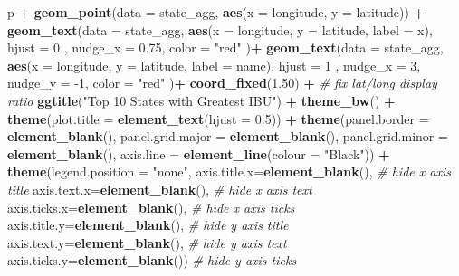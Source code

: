 \documentclass[
]{article}
\newenvironment{Shaded}{\begin{snugshade}}{\end{snugshade}}
\newcommand{\CommentTok}[1]{\textcolor[rgb]{0.56,0.35,0.01}{\textit{#1}}}
\newcommand{\DataTypeTok}[1]{\textcolor[rgb]{0.13,0.29,0.53}{#1}}
\newcommand{\DecValTok}[1]{\textcolor[rgb]{0.00,0.00,0.81}{#1}}
\newcommand{\FloatTok}[1]{\textcolor[rgb]{0.00,0.00,0.81}{#1}}
\newcommand{\KeywordTok}[1]{\textcolor[rgb]{0.13,0.29,0.53}{\textbf{#1}}}
\newcommand{\NormalTok}[1]{#1}
\newcommand{\OperatorTok}[1]{\textcolor[rgb]{0.81,0.36,0.00}{\textbf{#1}}}
\newcommand{\StringTok}[1]{\textcolor[rgb]{0.31,0.60,0.02}{#1}}
\begin{document}
\begin{Shaded}
\begin{Highlighting}[]
\NormalTok{p }\OperatorTok{+}\StringTok{ }\KeywordTok{geom_point}\NormalTok{(}\DataTypeTok{data =}\NormalTok{ state_agg, }\KeywordTok{aes}\NormalTok{(}\DataTypeTok{x =}\NormalTok{ longitude, }\DataTypeTok{y =}\NormalTok{ latitude)) }\OperatorTok{+}\StringTok{ }\KeywordTok{geom_text}\NormalTok{(}\DataTypeTok{data =}\NormalTok{ state_agg, }\KeywordTok{aes}\NormalTok{(}\DataTypeTok{x =}\NormalTok{ longitude, }\DataTypeTok{y =}\NormalTok{ latitude, }\DataTypeTok{label =}\NormalTok{ x), }\DataTypeTok{hjust =} \DecValTok{0}\NormalTok{ , }\DataTypeTok{nudge_x =} \FloatTok{0.75}\NormalTok{, }\DataTypeTok{color =} \StringTok{"red"}\NormalTok{ )}\OperatorTok{+}
\StringTok{   }\KeywordTok{geom_text}\NormalTok{(}\DataTypeTok{data =}\NormalTok{ state_agg, }\KeywordTok{aes}\NormalTok{(}\DataTypeTok{x =}\NormalTok{ longitude, }\DataTypeTok{y =}\NormalTok{ latitude, }\DataTypeTok{label =}\NormalTok{ name), }\DataTypeTok{hjust =} \DecValTok{1}\NormalTok{ , }\DataTypeTok{nudge_x =} \DecValTok{3}\NormalTok{, }\DataTypeTok{nudge_y =} \DecValTok{-1}\NormalTok{, }\DataTypeTok{color =} \StringTok{"red"}\NormalTok{ )}\OperatorTok{+}
\StringTok{  }\KeywordTok{coord_fixed}\NormalTok{(}\FloatTok{1.50}\NormalTok{) }\OperatorTok{+}\StringTok{ }\CommentTok{# fix lat/long display ratio}
\StringTok{  }\KeywordTok{ggtitle}\NormalTok{(}\StringTok{"Top 10 States with Greatest IBU"}\NormalTok{) }\OperatorTok{+}\StringTok{ }\KeywordTok{theme_bw}\NormalTok{() }\OperatorTok{+}\StringTok{ }\KeywordTok{theme}\NormalTok{(}\DataTypeTok{plot.title =} \KeywordTok{element_text}\NormalTok{(}\DataTypeTok{hjust =} \FloatTok{0.5}\NormalTok{)) }\OperatorTok{+}\StringTok{  }\KeywordTok{theme}\NormalTok{(}\DataTypeTok{panel.border =} \KeywordTok{element_blank}\NormalTok{(), }\DataTypeTok{panel.grid.major =} \KeywordTok{element_blank}\NormalTok{(), }\DataTypeTok{panel.grid.minor =} \KeywordTok{element_blank}\NormalTok{(), }\DataTypeTok{axis.line =} \KeywordTok{element_line}\NormalTok{(}\DataTypeTok{colour =} \StringTok{"Black"}\NormalTok{)) }\OperatorTok{+}\StringTok{ }
\StringTok{  }\KeywordTok{theme}\NormalTok{(}\DataTypeTok{legend.position =} \StringTok{"none"}\NormalTok{,}
        \DataTypeTok{axis.title.x=}\KeywordTok{element_blank}\NormalTok{(), }\CommentTok{# hide x axis title}
        \DataTypeTok{axis.text.x=}\KeywordTok{element_blank}\NormalTok{(),  }\CommentTok{# hide x axis text}
        \DataTypeTok{axis.ticks.x=}\KeywordTok{element_blank}\NormalTok{(), }\CommentTok{# hide x axis ticks}
        \DataTypeTok{axis.title.y=}\KeywordTok{element_blank}\NormalTok{(), }\CommentTok{# hide y axis title}
        \DataTypeTok{axis.text.y=}\KeywordTok{element_blank}\NormalTok{(),  }\CommentTok{# hide y axis text}
        \DataTypeTok{axis.ticks.y=}\KeywordTok{element_blank}\NormalTok{()) }\CommentTok{# hide y axis ticks}
\end{Highlighting}
\end{Shaded}
\end{document}
